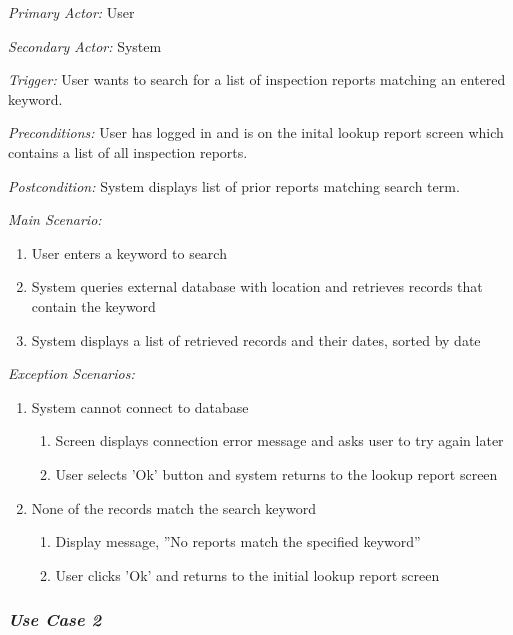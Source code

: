 \documentclass[twoside,letterpaper]{article}
\begin{document}
{\color{black} \textit{Primary Actor:} User}

{\color{black} \textit{Secondary Actor:} System}

{\color{black} \textit{Trigger:} User wants to search for a list of inspection reports matching an entered keyword.}

{\color{black} \textit{Preconditions:} User has logged in and is on the inital lookup report screen which contains a list of all inspection reports.}

{\color{black} \textit{Postcondition:} System displays list of prior reports matching search term.}
\newline

{\color{black} \textit{Main Scenario:}}
\begin{enumerate}
\item User enters a keyword to search
\item System queries external database with location and retrieves records that contain the keyword
\item System displays a list of retrieved records and their dates, sorted by date
\end{enumerate}

{\color{black} \textit{Exception Scenarios:}}
\begin{enumerate}
\item System cannot connect to database
\begin{enumerate}
\item Screen displays connection error message and asks user to try again later
\item User selects 'Ok' button and system returns to the lookup report screen
\end{enumerate}

\item None of the records match the search keyword
\begin{enumerate}
\item Display message, ''No reports match the specified keyword''
\item User clicks 'Ok' and returns to the initial lookup report screen
\end{enumerate}
\end{enumerate}

\subsubsection{\textit{Use Case 2}}
\end{document}
